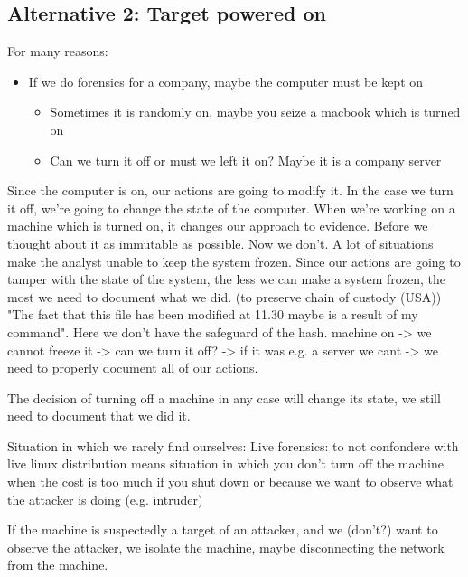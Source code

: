     \subsection{Alternative 2: Target powered on}
        For many reasons:
        \begin{itemize}
            \item If we do forensics for a company, maybe the computer must be kept on
            \begin{itemize}
                \item Sometimes it is randomly on, maybe you seize a macbook which is turned on
                \item Can we turn it off or must we left it on? Maybe it is a company server
            \end{itemize}
        \end{itemize}
        Since the computer is on, our actions are going to modify it.
        In the case we turn it off, we're going to change the state of the computer. When we're working on a machine which is turned on, it changes our approach to evidence. 
        Before we thought about it as immutable as possible. Now we don't.
        A lot of situations make the analyst unable to keep the system frozen.
        Since our actions are going to tamper with the state of the system, the less we can make a system frozen, the most we need to document what we did. (to preserve chain of custody (USA))
        "The fact that this file has been modified at 11.30 maybe is a result of my command".
        Here we don't have the safeguard of the hash.
        machine on -> we cannot freeze it -> can we turn it off? -> if it was e.g. a server we cant -> we need to properly document all of our actions.

        The decision of turning off a machine in any case will change its state, we still need to document that we did it.

        Situation in which we rarely find ourselves:
            Live forensics: to not confondere with live linux distribution
                means situation in which you don't turn off the machine 
                    when the cost is too much if you shut down 
                    or because we want to observe what the attacker is doing (e.g. intruder)

        If the machine is suspectedly a target of an attacker, and we (don't?) want to observe the attacker, we isolate the machine, maybe disconnecting the network from the machine.

